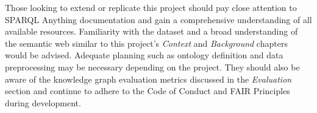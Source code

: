Those looking to extend or replicate this project should pay close attention to SPARQL Anything \cite{sparqlanythinggithub} documentation and gain a comprehensive understanding of all available resources. Familiarity with the dataset and a broad understanding of the semantic web similar to this project's \textit{Context} and \textit{Background} chapters would be advised. Adequate planning such as ontology definition and data preprocessing may be necessary depending on the project. They should also be aware of the knowledge graph evaluation metrics discussed in the \textit{Evaluation} section and continue to adhere to the Code of Conduct \cite{bcs} and FAIR Principles \cite{fairprinciples} during development. 

